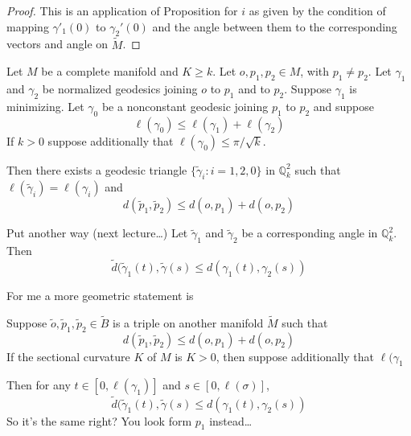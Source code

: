 \begin{proof}
This is an application of Proposition \label{proposition:contraction} for $i$ as
given by the condition of mapping $\gamma'_1(0)$ to $\gamma_2'(0)$ and the angle
between them to the corresponding vectors and angle on $\tilde{M}$.
\end{proof}

\begin{theorem} \label{theorem-toponogov-hinge}
Let $M$ be a complete manifold and $K \geq k$. Let $o,p_1,p_2 \in M$, with
$p_1\neq  p_2$. Let $\gamma_1$ and $\gamma_2$ be normalized geodesics joining 
$o$ to $p_1$ and to $p_2$. Suppose $\gamma_1$ is minimizing.
Let $\gamma_0$ be a nonconstant geodesic joining $p_1$ to $p_2$ and suppose
$$
\ell(\gamma_0) \leq \ell(\gamma_1) +\ell(\gamma_2)
$$
If $k>0$ suppose additionally that $\ell(\gamma_0) \leq \pi/\sqrt{k}$.

Then there exists a geodesic triangle $\{\tilde{\gamma}_i:i=1,2,0\}$ in
$\mathbb{Q}_k^2$ such that $\ell(\tilde{\gamma}_i) = \ell(\gamma_i)$ and
$$
d(\tilde{p}_1,\tilde{p}_2) \leq  d(o,p_1)+d(o,p_2)
$$

Put another way (next lecture…) Let $\tilde{\gamma}_1$ and $\tilde{\gamma}_2$ 
be a corresponding angle in $\mathbb{Q}_k^2$. Then
$$
\tilde{d}(\tilde{\gamma}_1(t),\tilde{\gamma}(s)\leq d(\gamma_1(t),\gamma_2(s))
$$

\end{theorem}

\begin{remark}
For me a more geometric statement is



Suppose $\tilde{o}, \tilde{p}_1,\tilde{p}_2 \in \tilde{B}$ is a triple on 
another manifold $\tilde{M}$ such that 
$$
d(\tilde{p}_1,\tilde{p}_2) \leq  d(o,p_1)+d(o,p_2)
$$
If the sectional curvature $K$ of $M$ is $K>0$, then suppose additionally that
$\ell(\gamma_1$

Then for any $t \in [0,\ell(\gamma_1)]$ and $s \in [0,\ell(\sigma)]$,
$$
\tilde{d}(\tilde{\gamma}_1(t),\tilde{\gamma}(s)\leq d(\gamma_1(t),\gamma_2(s))
$$
So it's the same right? You look form $p_1$ instead…
\end{remark}



\label{section-}












%

\clearpage





